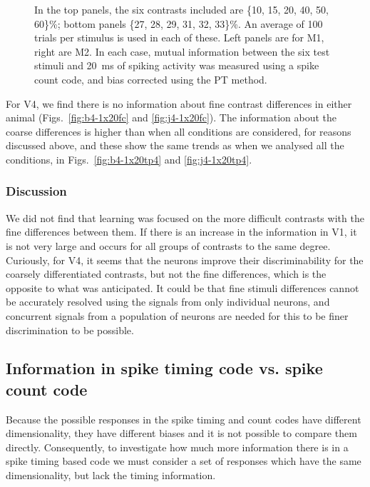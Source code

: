 \begin{figure}[htbp]
{%
In the top panels, the six contrasts included are \{10, 15, 20, 40, 50, 60\}\%; bottom panels \{27, 28, 29, 31, 32, 33\}\%. An average of 100 trials per stimulus is used in each of these.
Left panels are for \ac{M1}, right are \ac{M2}.
In each case, mutual information between the six test stimuli and \SI{20}{ms} of spiking activity was measured using a spike count code, and bias corrected using the \ac{PT} method.
}
    \label{fig:v4-fvc}
\end{figure}

For \ac{V4}, we find there is no information about fine contrast differences in either animal (Figs.~\ref{fig:b4-1x20fc} and \ref{fig:j4-1x20fc}).
The information about the coarse differences is higher than when all conditions are considered, for reasons discussed above, and these show the same trends as when we analysed all the conditions, in Figs.~\ref{fig:b4-1x20tp4} and \ref{fig:j4-1x20tp4}.


\subsubsection{Discussion}

We did not find that learning was focused on the more difficult contrasts with the fine differences between them.
If there is an increase in the information in \ac{V1}, it is not very large and occurs for all groups of contrasts to the same degree.
Curiously, for \ac{V4}, it seems that the neurons improve their discriminability for the coarsely differentiated contrasts, but not the fine differences, which is the opposite to what was anticipated.
It could be that fine stimuli differences cannot be accurately resolved using the signals from only individual neurons, and concurrent signals from a population of neurons are needed for this to be finer discrimination to be possible.


\subsection{Information in spike timing code vs. spike count code}

Because the possible responses in the spike timing and count codes have different dimensionality, they have different biases \citep{Panzeri2007} and it is not possible to compare them directly.
Consequently, to investigate how much more information there is in a spike timing based code we must consider a set of responses which have the same dimensionality, but lack the timing information.

